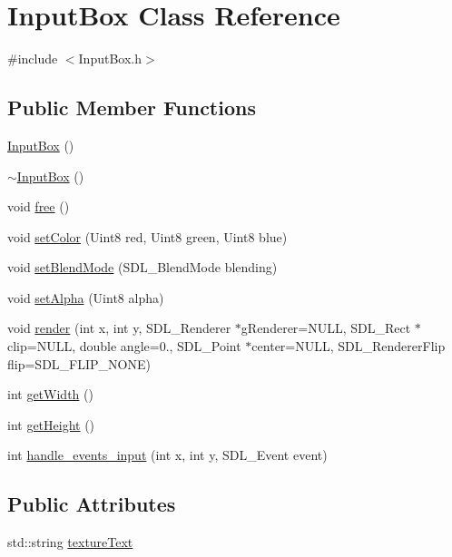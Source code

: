\hypertarget{class_input_box}{}\section{Input\+Box Class Reference}
\label{class_input_box}


{\ttfamily \#include $<$Input\+Box.\+h$>$}

\subsection*{Public Member Functions}
\begin{DoxyCompactItemize}
\item 
\mbox{\hyperlink{class_input_box_a2cc665db8204ff3977b3601983dcad37}{Input\+Box}} ()
\item 
\mbox{\hyperlink{class_input_box_abe56acf07570e1ff883705edf3223b5b}{$\sim$\+Input\+Box}} ()
\item 
void \mbox{\hyperlink{class_input_box_aa5730c412bd2cb438d3920d457422899}{free}} ()
\item 
void \mbox{\hyperlink{class_input_box_a9a9388c59f2621ff2b59132c85dc5c73}{set\+Color}} (Uint8 red, Uint8 green, Uint8 blue)
\item 
void \mbox{\hyperlink{class_input_box_a98d23652bac1d030d49beccf2024e776}{set\+Blend\+Mode}} (S\+D\+L\+\_\+\+Blend\+Mode blending)
\item 
void \mbox{\hyperlink{class_input_box_a89ed2dbe4177e9f1d1cf78b61b2bc160}{set\+Alpha}} (Uint8 alpha)
\item 
void \mbox{\hyperlink{class_input_box_aaef7aedcfacc3258bdc97b1655373ac4}{render}} (int x, int y, S\+D\+L\+\_\+\+Renderer $\ast$g\+Renderer=N\+U\+LL, S\+D\+L\+\_\+\+Rect $\ast$clip=N\+U\+LL, double angle=0., S\+D\+L\+\_\+\+Point $\ast$center=N\+U\+LL, S\+D\+L\+\_\+\+Renderer\+Flip flip=S\+D\+L\+\_\+\+F\+L\+I\+P\+\_\+\+N\+O\+NE)
\item 
int \mbox{\hyperlink{class_input_box_a2b728710292ab4f2503d8fcf660e5c1a}{get\+Width}} ()
\item 
int \mbox{\hyperlink{class_input_box_a8c812e49244c0e602e19bd7924b8779e}{get\+Height}} ()
\item 
int \mbox{\hyperlink{class_input_box_a23ab41b0bda383c054c2b25257df47e8}{handle\+\_\+events\+\_\+input}} (int x, int y, S\+D\+L\+\_\+\+Event event)
\end{DoxyCompactItemize}
\subsection*{Public Attributes}
\begin{DoxyCompactItemize}
\item 
std\+::string \mbox{\hyperlink{class_input_box_a484ab55097789bae12b3c6e4264f836e}{texture\+Text}}
\end{DoxyCompactItemize}
